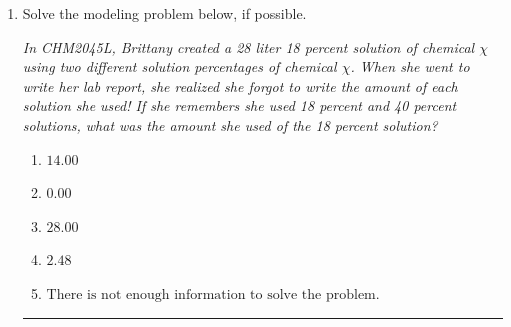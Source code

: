 \documentclass[14pt]{extbook}
\newcommand{\litem}[1]{\item#1\hspace*{-1cm}\rule{\textwidth}{0.4pt}}
\begin{document}
\begin{enumerate}
{\begin{enumerate}[label=\Alph*.]
\end{enumerate} }
\litem{
Solve the modeling problem below, if possible.
\begin{center}
    \textit{ In CHM2045L, Brittany created a 28 liter 18 percent solution of chemical $\chi$ using two different solution percentages of chemical $\chi$. When she went to write her lab report, she realized she forgot to write the amount of each solution she used! If she remembers she used 18 percent and 40 percent solutions, what was the amount she used of the 18 percent solution? }
\end{center}
\begin{enumerate}[label=\Alph*.]
\item \( 14.00 \)
\item \( 0.00 \)
\item \( 28.00 \)
\item \( 2.48 \)
\item \( \text{There is not enough information to solve the problem.} \)

\end{enumerate} }
\end{enumerate}
\end{document}
